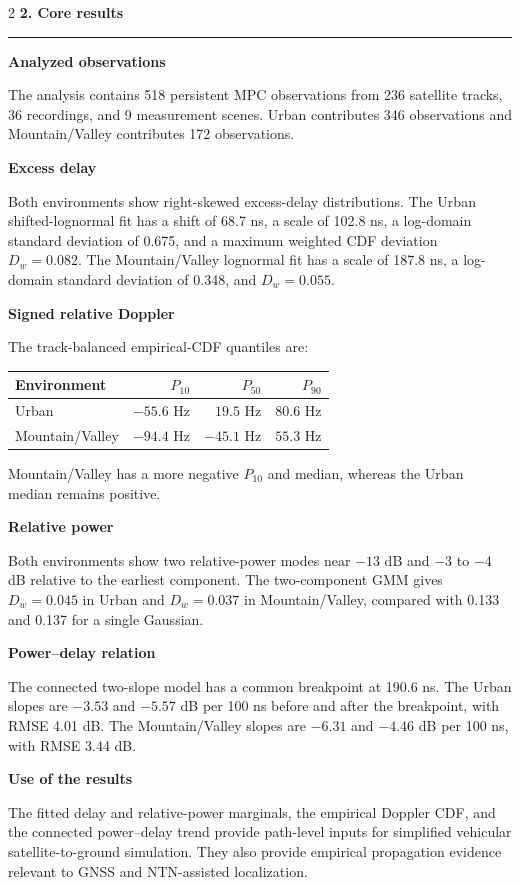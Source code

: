 \documentclass[10pt]{article}
\newcommand{\previewsection}[1]{%
  \vspace{4pt}\noindent\textbf{\large #1}\par\vspace{1pt}\hrule\vspace{3pt}}
\newcommand{\previewsubsection}[1]{%
  \vspace{2pt}\noindent\textbf{#1}\par\vspace{1pt}}
\begin{document}
\begin{multicols}{2}
\previewsection{2. Core results}

\previewsubsection{Analyzed observations}
The analysis contains 518 persistent MPC observations from 236 satellite tracks, 36 recordings, and 9 measurement scenes. Urban contributes 346 observations and Mountain/Valley contributes 172 observations.

\previewsubsection{Excess delay}
Both environments show right-skewed excess-delay distributions. The Urban shifted-lognormal fit has a shift of 68.7 ns, a scale of 102.8 ns, a log-domain standard deviation of 0.675, and a maximum weighted CDF deviation $D_w=0.082$. The Mountain/Valley lognormal fit has a scale of 187.8 ns, a log-domain standard deviation of 0.348, and $D_w=0.055$.

\previewsubsection{Signed relative Doppler}
The track-balanced empirical-CDF quantiles are:
\begin{center}
\footnotesize
\begin{tabular}{lrrr}
\textbf{Environment} & $P_{10}$ & $P_{50}$ & $P_{90}$\\
\hline
Urban & $-55.6$ Hz & $19.5$ Hz & $80.6$ Hz\\
Mountain/Valley & $-94.4$ Hz & $-45.1$ Hz & $55.3$ Hz
\end{tabular}
\end{center}
Mountain/Valley has a more negative $P_{10}$ and median, whereas the Urban median remains positive.

\previewsubsection{Relative power}
Both environments show two relative-power modes near $-13$ dB and $-3$ to $-4$ dB relative to the earliest component. The two-component GMM gives $D_w=0.045$ in Urban and $D_w=0.037$ in Mountain/Valley, compared with 0.133 and 0.137 for a single Gaussian.

\previewsubsection{Power--delay relation}
The connected two-slope model has a common breakpoint at 190.6 ns. The Urban slopes are $-3.53$ and $-5.57$ dB per 100 ns before and after the breakpoint, with RMSE 4.01 dB. The Mountain/Valley slopes are $-6.31$ and $-4.46$ dB per 100 ns, with RMSE 3.44 dB.

\previewsubsection{Use of the results}
The fitted delay and relative-power marginals, the empirical Doppler CDF, and the connected power--delay trend provide path-level inputs for simplified vehicular satellite-to-ground simulation. They also provide empirical propagation evidence relevant to GNSS and NTN-assisted localization.

\end{multicols}
\end{document}
